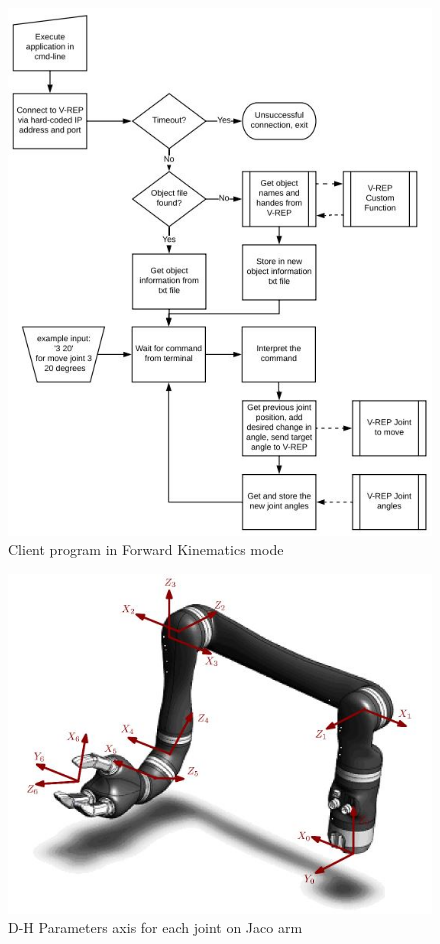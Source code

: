 \documentclass[12pt,openany,a4paper]{book}
\begin{document}
\begin{center}
\begin{figure}[htb]
  \includegraphics[width=\linewidth]{client_fk.jpg}
\caption{Client program in Forward Kinematics mode}
\end{figure}
\end{center}

\begin{center}
\begin{figure}[htb]
  \includegraphics[width=0.7\linewidth]{jaco_axis.jpg}
\caption{D-H Parameters axis for each joint on Jaco arm}
\end{figure}
\end{center}
\end{document}
